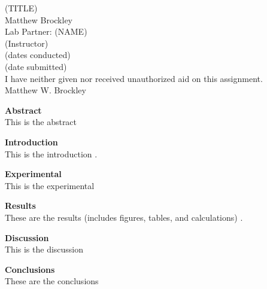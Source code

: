 \documentclass[12pt]{article}
\begin{document}
\begin{center}
(TITLE)\\
Matthew Brockley\\
Lab Partner: (NAME)\\
(Instructor)\\
(dates conducted)\\
(date submitted)\\
I have neither given nor received unauthorized aid on this assignment.\\
Matthew W. Brockley
\pagestyle{empty}
\end{center}

\newpage
\begin{flushleft}
\textbf{Abstract}\\
\setlength{\parindent}{0.5in}
This is the abstract

\newpage
\noindent\textbf{Introduction}\\
This is the introduction \autocite{giddings2020characterization}.

\newpage
\noindent\textbf{Experimental}\\
This is the experimental \autocite{bontemps2018global}

\newpage
\noindent\textbf{Results}\\
These are the results (includes figures, tables, and calculations) \autocite{stargazer}.

\newpage
\noindent\textbf{Discussion}\\
This is the discussion

\newpage
\noindent\textbf{Conclusions}\\
These are the conclusions

\newpage
\printbibliography


\end{flushleft}
\end{document}
